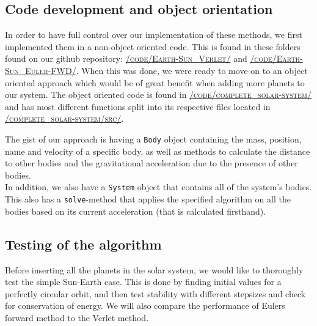 \documentclass[../main.tex]{subfiles}
\begin{document}
\subsection{Code development and object orientation}
In order to have full control over our implementation of these methods, we first implemented them in a non-object oriented code. This is found in these folders found on our github repository\cite{repository}: \href{https://github.com/kmaasrud/Project-5/blob/master/code/Earth-Sun_Verlet/}{\textsc{/code/Earth-Sun\_Verlet/}} and \href{https://github.com/kmaasrud/Project-5/blob/master/code/Earth-Sun_Euler-FWD/}{\textsc{/code/Earth-Sun\_Euler-FWD/}}. When this was done, we were ready to move on to an object oriented approach which would be of great benefit when adding more planets to our system.
The object oriented code is found in \href{https://github.com/kmaasrud/Project-5/blob/master/code/complete_solar-system/}{\textsc{/code/complete\_solar-system/}} and has most different functions split into its respective files located in \href{https://github.com/kmaasrud/Project-5/blob/master/code/complete_solar-system/src/}{\textsc{/complete\_solar-system/src/}}.

The gist of our approach is having a \verb+Body+ object containing the mass, position, name and velocity of a specific body, as well as methods to calculate the distance to other bodies and the gravitational acceleration due to the presence of other bodies. \\
In addition, we also have a \verb+System+ object that contains all of the system's bodies. This also has a \verb+solve+-method that applies the specified algorithm on all the bodies based on its current acceleration (that is calculated firsthand). \\


\subsection{Testing of the algorithm}
Before inserting all the planets in the solar system, we would like to thoroughly test the simple Sun-Earth case. This is done by finding initial values for a perfectly circular orbit, and then test stability with different stepsizes and check for conservation of energy. We will also compare the performance of Eulers forward method to the Verlet method.

\end{document}
